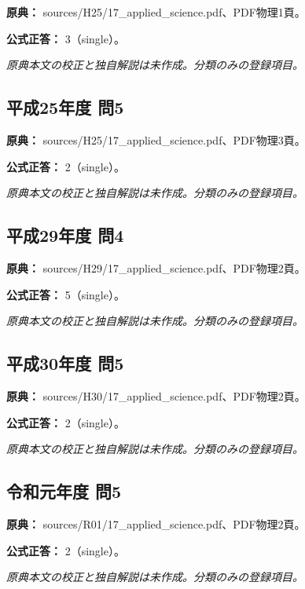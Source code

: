 \noindent\textbf{原典：} sources/H25/17\_applied\_science.pdf、PDF物理1頁。

\textbf{公式正答：} 3（single）。

\par\textit{原典本文の校正と独自解説は未作成。分類のみの登録項目。}

\subsection{平成25年度 問5}
\label{q:h25-reg-applied-05}

\noindent\textbf{原典：} sources/H25/17\_applied\_science.pdf、PDF物理3頁。

\textbf{公式正答：} 2（single）。

\par\textit{原典本文の校正と独自解説は未作成。分類のみの登録項目。}

\subsection{平成29年度 問4}
\label{q:h29-reg-applied-04}

\noindent\textbf{原典：} sources/H29/17\_applied\_science.pdf、PDF物理2頁。

\textbf{公式正答：} 5（single）。

\par\textit{原典本文の校正と独自解説は未作成。分類のみの登録項目。}

\subsection{平成30年度 問5}
\label{q:h30-reg-applied-05}

\noindent\textbf{原典：} sources/H30/17\_applied\_science.pdf、PDF物理2頁。

\textbf{公式正答：} 2（single）。

\par\textit{原典本文の校正と独自解説は未作成。分類のみの登録項目。}

\subsection{令和元年度 問5}
\label{q:r01-reg-applied-05}

\noindent\textbf{原典：} sources/R01/17\_applied\_science.pdf、PDF物理2頁。

\textbf{公式正答：} 2（single）。

\par\textit{原典本文の校正と独自解説は未作成。分類のみの登録項目。}

